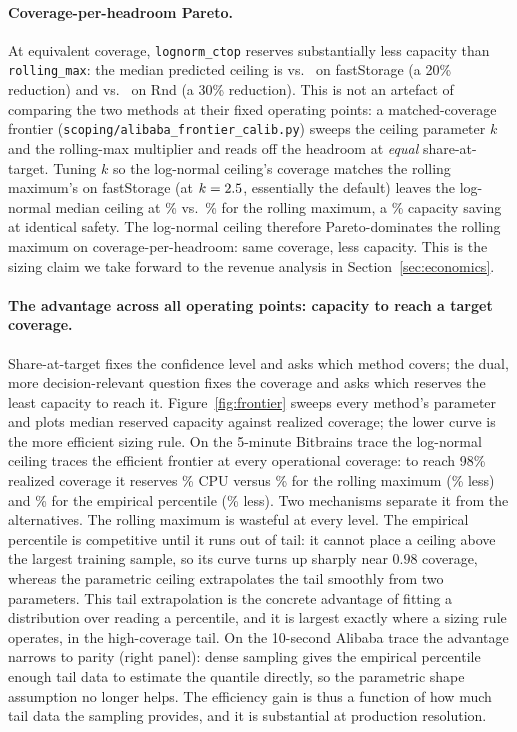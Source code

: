 \documentclass[11pt,a4paper]{article}
\begin{document}
\paragraph{Coverage-per-headroom Pareto.} At equivalent coverage,
\texttt{lognorm\_ctop} reserves substantially less capacity than
\texttt{rolling\_max}: the median predicted ceiling is \UFsLNCeiling{}
vs.\ \UFsRMCeiling{} on fastStorage (a 20\% reduction) and
\URnLNCeiling{} vs.\ \URnRMCeiling{} on Rnd (a 30\% reduction). This is
not an artefact of comparing the two methods at their fixed operating
points: a matched-coverage frontier
(\texttt{scoping/alibaba\_frontier\_calib.py}) sweeps the ceiling
parameter $k$ and the rolling-max multiplier and reads off the headroom
at \emph{equal} share-at-target. Tuning $k$ so the log-normal ceiling's
coverage matches the rolling maximum's on fastStorage (at $k=2.5$,
essentially the default) leaves the log-normal median ceiling at
\McFsLnCeil{}\% vs.\ \McFsRmCeil{}\% for the rolling maximum, a
\McFsSavePct{}\% capacity saving at identical safety. The log-normal
ceiling therefore Pareto-dominates the rolling maximum on
coverage-per-headroom: same coverage, less capacity. This is the
sizing claim we take forward to the revenue analysis in
Section~\ref{sec:economics}.

\paragraph{The advantage across all operating points: capacity to reach a
target coverage.} Share-at-target fixes the confidence level and asks
which method covers; the dual, more decision-relevant question fixes the
coverage and asks which reserves the least capacity to reach it.
Figure~\ref{fig:frontier} sweeps every method's parameter and plots
median reserved capacity against realized coverage; the lower curve is
the more efficient sizing rule. On the 5-minute Bitbrains trace the
log-normal ceiling traces the efficient frontier at every operational
coverage: to reach 98\% realized coverage it reserves \CapFsLn{}\% CPU
versus \CapFsRm{}\% for the rolling maximum (\CapFsSaveRm{}\% less) and
\CapFsEp{}\% for the empirical percentile (\CapFsSaveEp{}\% less). Two
mechanisms separate it from the alternatives. The rolling maximum is
wasteful at every level. The empirical percentile is competitive until it
runs out of tail: it cannot place a ceiling above the largest training
sample, so its curve turns up sharply near $0.98$ coverage, whereas the
parametric ceiling extrapolates the tail smoothly from two parameters.
This tail extrapolation is the concrete advantage of fitting a
distribution over reading a percentile, and it is largest exactly where a
sizing rule operates, in the high-coverage tail. On the 10-second Alibaba
trace the advantage narrows to parity (right panel): dense sampling gives
the empirical percentile enough tail data to estimate the quantile
directly, so the parametric shape assumption no longer helps. The
efficiency gain is thus a function of how much tail data the sampling
provides, and it is substantial at production resolution.
\end{document}
